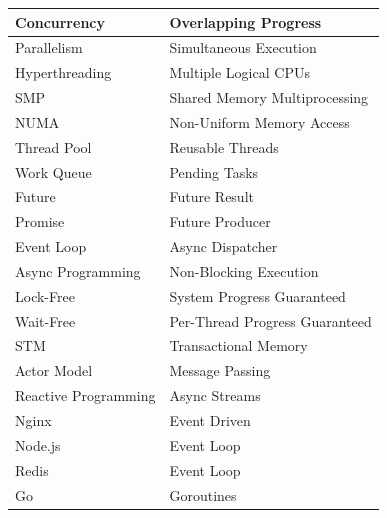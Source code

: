 \begin{center}
\begin{tabular}{|p{5cm}|p{8cm}|}
\hline
Concurrency & Overlapping Progress \\
\hline
Parallelism & Simultaneous Execution \\
\hline
Hyperthreading & Multiple Logical CPUs \\
\hline
SMP & Shared Memory Multiprocessing \\
\hline
NUMA & Non-Uniform Memory Access \\
\hline
Thread Pool & Reusable Threads \\
\hline
Work Queue & Pending Tasks \\
\hline
Future & Future Result \\
\hline
Promise & Future Producer \\
\hline
Event Loop & Async Dispatcher \\
\hline
Async Programming & Non-Blocking Execution \\
\hline
Lock-Free & System Progress Guaranteed \\
\hline
Wait-Free & Per-Thread Progress Guaranteed \\
\hline
STM & Transactional Memory \\
\hline
Actor Model & Message Passing \\
\hline
Reactive Programming & Async Streams \\
\hline
Nginx & Event Driven \\
\hline
Node.js & Event Loop \\
\hline
Redis & Event Loop \\
\hline
Go & Goroutines \\
\hline
\end{tabular}
\end{center}